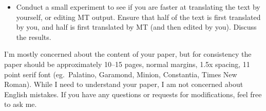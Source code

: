 \documentclass[10pt]{article}
\begin{document}
\begin{spacing}{1.35}
\begin{itemize}
\item Conduct a small experiment to see if you are faster at translating the text by yourself, or editing MT output.
	Ensure that half of the text is first translated by you, and half is first translated by MT (and then edited by you).
	Discuss the results.

\end{itemize}

I'm mostly concerned about the content of your paper, but for consistency the paper should be approximately 10--15 pages, normal margins, 1.5x spacing, 11 point serif font (eg.~Palatino, Garamond, Minion, Constantia, Times New Roman).
While I need to understand your paper, I am not concerned about English mistakes.
If you have any questions or requests for modifications, feel free to ask me.


\end{spacing}
%
\end{document}
